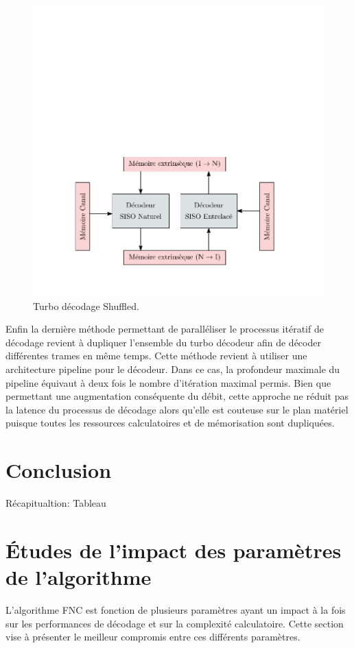 \begin{figure}[!h]
	\centering
	\includegraphics{main/ch4_fig/ipe/shuffled.pdf}
	\caption{Turbo décodage Shuffled. \label{fig:turbo_suff}}
\end{figure}

Enfin la dernière méthode permettant de paralléliser le processus itératif de décodage revient à dupliquer l'ensemble 
du turbo décodeur afin de décoder différentes trames en même temps. Cette méthode revient à utiliser une architecture 
pipeline pour le décodeur. Dans ce cas, la profondeur maximale du pipeline équivaut à deux fois le nombre d'itération 
maximal permis. Bien que permettant une augmentation 
conséquente du débit, cette approche ne réduit pas la latence du processus de décodage alors qu'elle est couteuse sur 
le plan matériel puisque toutes les ressources calculatoires et de mémorisation sont dupliquées.


\section{Conclusion}
Récapitualtion:
Tableau 


\newpage
\section{Études de l'impact des paramètres de l'algorithme}
L'algorithme FNC est fonction de plusieurs paramètres ayant un impact à la fois sur les performances de décodage et sur
la complexité calculatoire. Cette section vise à présenter le meilleur compromis entre ces différents paramètres.

